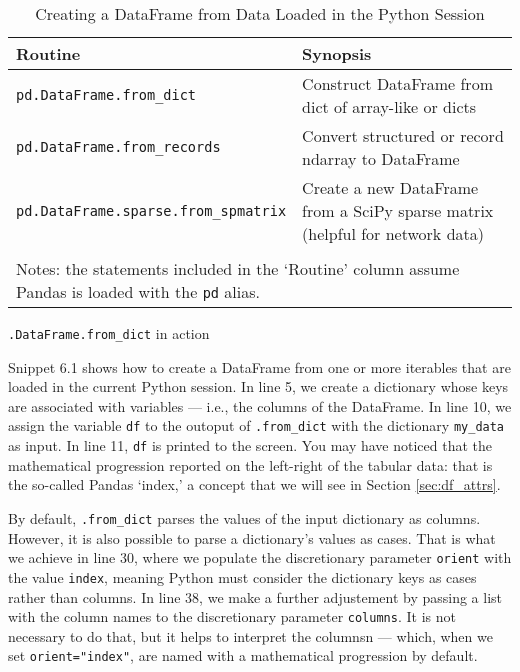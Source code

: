 \documentclass[a4paper,11pt]{book}
\numberwithin{figure}{chapter}
\numberwithin{table}{chapter}
\newcommand{\question}[1]{%
    \begin{tcolorbox}[colback=comp_c!10,colframe=comp_c,sidebyside align=top,width=\linewidth,before skip=1ex]
        #1
    \end{tcolorbox}
    \switchcolumn%
}
\newcommand{\note}[1]{%
    \begin{tcolorbox}[colback=white!0,colframe=white!10,width=\linewidth,before skip=1ex]
        #1
    \end{tcolorbox}
}
\begin{document}
\begin{sidewaystable}[!htbp]
	\centering
	\caption{Creating a DataFrame from Data Loaded in the Python Session}
	\label{tab:read_methods}
	\begin{tabular}{ll}
		\toprule \toprule 
		Routine & Synopsis \\
		\midrule 
		\texttt{pd.DataFrame.from\_dict} & Construct DataFrame from dict of array-like or dicts\\ 
		\texttt{pd.DataFrame.from\_records} & Convert structured or record ndarray to DataFrame\\
		\texttt{pd.DataFrame.sparse.from\_spmatrix} & Create a new DataFrame from a SciPy sparse matrix (helpful for network data)\\ 
		\bottomrule \\[-1.8ex]
		\multicolumn{2}{l}{Notes: the statements included in the `Routine' column assume Pandas is loaded with the \texttt{pd} alias.} \\
	\end{tabular}
\end{sidewaystable}
\clearpage

\begin{paracol}{2}
	\question{\raggedright \texttt{.DataFrame.from\_dict} in action}
	\note{
		Snippet 6.1 shows how to create a DataFrame from one or more iterables that are loaded in the current Python session. In line 5, we create a dictionary whose keys are associated with variables --- i.e., the columns of the DataFrame. In line 10, we assign the variable \texttt{df} to the outoput of \texttt{.from\_dict} with the dictionary \texttt{my\_data} as input. In line 11, \texttt{df} is printed to the screen. You may have noticed that the mathematical progression reported on the left-right of the tabular data: that is the so-called Pandas `index,' a concept that we will see in Section \ref{sec:df_attrs}.
	
		\quad By default, \texttt{.from\_dict} parses the values of the input dictionary as columns. However, it is also possible to parse a dictionary's values as cases. That is what we achieve in line 30, where we populate the discretionary parameter \texttt{orient} with the value \texttt{index}, meaning Python must consider the dictionary keys as cases rather than columns. In line 38, we make a further adjustement by passing a list with the column names to the discretionary parameter \texttt{columns}. It is not necessary to do that, but it helps to interpret the columnsn --- which, when we set \texttt{orient="index"}, are named with a mathematical progression by default.
	}
\end{paracol}
\end{document}
